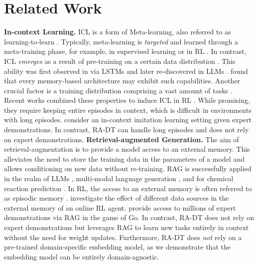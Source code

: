 \documentclass{article}
\begin{document}
\section{Related Work}\label{sec:relatedwork}
\textbf{In-context Learning.}
ICL is a form of Meta-learning, also referred to as learning-to-learn \citep{Schmidhuber:87}.
Typically, meta-learning is \emph{targeted} and learned through a meta-training phase, for example, in supervised learning \citep{Santoro:16,Mishra:18,Finn:17} or in RL \citep{Wang:16,Duan:16,Kirsch:19,Flennerhag:19}.
In contrast, ICL \emph{emerges} as a result of pre-training on a certain data distribution \citep{Chan:22}.
This ability was first observed in \citet{Hochreiter:01} via LSTMs \citep{Hochreiter:97} and later re-discovered in LLMs \citep{Brown:20}.
\citet{Ortega:2019} found that every memory-based architecture may exhibit such capabilities.
Another crucial factor is a training distribution comprising a vast amount of tasks \citep{Chan:22,Kirsch:22}.
Recent works combined these properties to induce ICL in RL  \citep{Laskin:22,Lee:22,Kirsch:23}.
While promising, they require keeping entire episodes in context, which is difficult in environments with long episodes.
\citet{Raparthy:23} consider an in-context imitation learning setting given expert demonstrations.
In contrast, RA-DT can handle long episodes and does not rely on expert demonstrations.
\textbf{Retrieval-augmented Generation.}
The aim of retrieval-augmentation is to provide a model access to an external memory.
This alleviates the need to store the training data in the parameters of a model and allows conditioning on new data without re-training.
RAG is successfully applied in the realm of LLMs \citep{Khandelwal:19,Guu:20,Lewis:20,Borgeaud:22,Izacard:22,Ram:23}, multi-modal language generation \citep{hu_reveal_2023,yasunaga_retrieval_2023,yang_revilm_2023,ramos_smallcap_2022}, and for chemical reaction prediction \citep{Seidl:22}.
In RL, the access to an external memory is often referred to as episodic memory \citep{Sprechmann:18,Blundell:2016,Pritzel:2017}.
\citet{Goyal:22} investigate the effect of different data sources in the external memory of an online RL agent. \citep{Humphreys:22} provide access to millions of expert demonstrations via RAG in the game of Go.
In contrast, RA-DT does not rely on expert demonstrations but leverages RAG to learn new tasks entirely in context without the need for weight updates.
Furthermore, RA-DT does \emph{not} rely on a pre-trained domain-specific embedding model, as we demonstrate that the embedding model can be entirely domain-agnostic.
\end{document}
